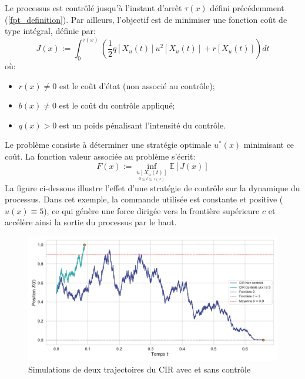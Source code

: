 Le processus est contrôlé jusqu'à l'instant d'arrêt $\tau(x)$ défini précédemment (\ref{fpt_definition}).
Par ailleurs, l'objectif est de minimiser une fonction coût de type intégral, définie par:
\begin{equation}\label{cost_function}
    J(x) := \int_0^{\tau(x)} \left( \frac{1}{2}q[X_u(t)]u^2[X_u(t)] + r[X_u(t)] \right) dt
\end{equation}
où:
\begin{itemize}
    \item \( r(x) \neq 0 \) est le coût d'état (non associé au contrôle);
    \item \( b(x) \neq 0 \) est le coût du contrôle appliqué;
    \item \( q(x) > 0 \) est un poids pénalisant l'intensité du contrôle.
\end{itemize}
Le problème consiste à déterminer une stratégie optimale \( u^*(x) \) minimisant ce coût. La fonction valeur associée au problème s'écrit:
\begin{equation}\label{value_function}
    F(x) := \inf_{\underset{0 \leq t \leq \tau(x)}{u[X_u(t)]}} \mathds{E}[J(x)]
\end{equation}
La figure ci-dessous illustre l'effet d'une stratégie de contrôle sur la dynamique du processus. Dans cet exemple, la commande utilisée est constante et positive ($u(x)\equiv5$), ce qui génère une force dirigée vers la frontière supérieure \( c \) et accélère ainsi la sortie du processus par le haut.
\begin{figure}[htb]
    \centering
    \includegraphics[width=0.9\linewidth]{img/intro/control.pdf}
    \caption{Simulations de deux trajectoires du CIR avec et sans contrôle}\label{fig:ControlViz}
\end{figure}
\FloatBarrier



\clearpage

